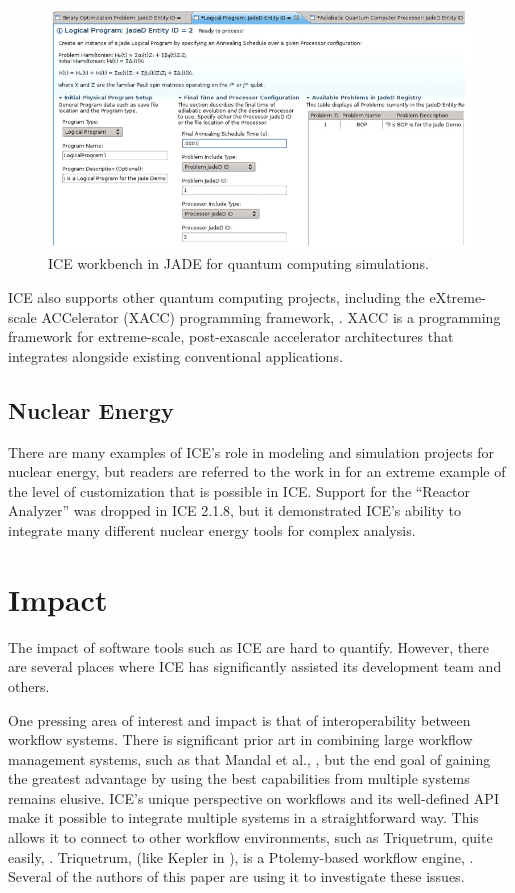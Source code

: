 \begin{figure}[htbp]
\centering
\includegraphics[width=\textwidth]{images/jaded.png}
\caption{ICE workbench in JADE for quantum computing simulations.}
\end{figure}

ICE also supports other quantum computing projects, including the
eXtreme-scale ACCelerator (XACC) programming framework,
\cite{mccaskey_ornl-qci/xacc_2016}. XACC is a programming framework for
extreme-scale, post-exascale accelerator architectures that integrates
alongside existing conventional applications.

\subsection{Nuclear Energy}\label{nuclear-energy}

There are many examples of ICE's role in modeling and simulation
projects for nuclear energy, but readers are referred to the work in
\cite{billings_domain-specific_2015} for an extreme example of the level of
customization that is possible in ICE. Support for the ``Reactor
Analyzer'' was dropped in ICE 2.1.8, but it demonstrated ICE's ability
to integrate many different nuclear energy tools for complex analysis.

\section{Impact}\label{impact}

The impact of software tools such as ICE are hard to quantify. However,
there are several places where ICE has significantly assisted its
development team and others.

One pressing area of interest and impact is that of interoperability
between workflow systems. There is significant prior art in combining
large workflow management systems, such as that Mandal et al.,
\cite{mandal_integrating_2007}, but the end goal of gaining the greatest
advantage by using the best capabilities from multiple systems remains elusive.
ICE's unique perspective on workflows and its well-defined API make it
possible to integrate multiple systems in a straightforward way. This
allows it to connect to other workflow environments, such as Triquetrum,
quite easily, \cite{brooks_introducing_2016}. Triquetrum, (like Kepler in
\cite{mandal_integrating_2007}), is a Ptolemy-based workflow engine,
\cite{brooks_triquetrum:_2015}. Several of the authors of this paper are using
it to investigate these issues.

